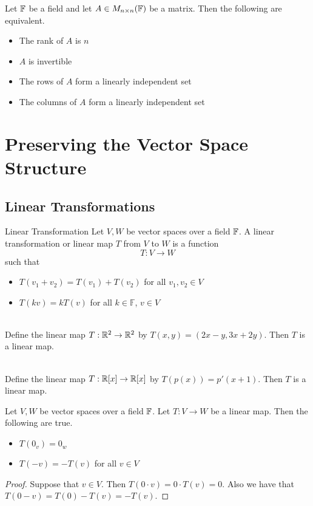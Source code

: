 \documentclass[a4paper]{article}
\begin{document}
\begin{prp}{}{} Let $\mathbb{F}$ be a field and let $A\in M_{n\times n}(\mathbb{F})$ be a matrix. Then the following are equivalent. 
\begin{itemize}
\item The rank of $A$ is $n$
\item $A$ is invertible
\item The rows of $A$ form a linearly independent set
\item The columns of $A$ form a linearly independent set
\end{itemize}
\end{prp}

\pagebreak
\section{Preserving the Vector Space Structure}
\subsection{Linear Transformations}
\begin{defn}{Linear Transformation}{} Let $V,W$ be vector spaces over a field $\mathbb{F}$. A linear transformation or linear map $T$ from $V$ to $W$ is a function $$T:V\to W$$ such that 
\begin{itemize}
\item $T(v_1+v_2)=T(v_1)+T(v_2)$ for all $v_1,v_2\in V$
\item $T(kv)=kT(v)$ for all $k\in\mathbb{F}$, $v\in V$
\end{itemize}
\end{defn}

\begin{eg}{}{}\\
Define the linear map $T:\mathbb{R}^2\to\mathbb{R}^2$ by $T(x,y)=(2x-y,3x+2y)$. Then $T$ is a linear map. 
\end{eg}

\begin{eg}{}{}\\
Define the linear map $T:\mathbb{R}[x]\to\mathbb{R}[x]$ by $T(p(x))=p'(x+1)$. Then $T$ is a linear map. 
\end{eg}

\begin{lmm}{}{} Let $V,W$ be vector spaces over a field $\mathbb{F}$. Let $T:V\to W$ be a linear map. Then the following are true. 
\begin{itemize}
\item $T(0_v)=0_w$
\item $T(-v)=-T(v)$ for all $v\in V$
\end{itemize}
\begin{proof} Suppose that $v\in V$. Then $T(0\cdot v)=0\cdot T(v)=0$. Also we have that $T(0-v)=T(0)-T(v)=-T(v)$. 
\end{proof}
\end{lmm}
\end{document}
